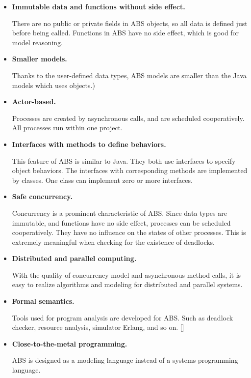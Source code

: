 \documentclass[article,dr=phil,type=drfinal,colorback,accentcolor=tud9c]{tudthesis}
\begin{document}
  \begin{itemize}
  	
  \item \textbf{Immutable data and functions without side effect.}
  
  There are no public or private fields in ABS objects, so all data is defined just before being called. Functions in ABS have no side effect, which is good for model reasoning.
  
  \item \textbf{Smaller models.}
   
  Thanks to the user-defined data types, ABS models are smaller than the Java models which uses objects.)
  
  \item \textbf{Actor-based.}
  
  Processes are created by asynchronous calls, and are scheduled cooperatively. All processes run within one project.
  
  \item \textbf{Interfaces with methods to define behaviors.}
  
  This feature of ABS is similar to Java. They both use interfaces to specify object behaviors. The interfaces with corresponding methods are implemented by classes. One class can implement zero or more interfaces.
  
  \item \textbf{Safe concurrency.}
  
  Concurrency is a prominent characteristic of ABS. Since data types are immutable, and functions have no side effect, processes can be scheduled cooperatively. They have no influence on the states of other processes. This is extremely meaningful when checking for the existence of deadlocks.
  
  \item \textbf{Distributed and parallel computing.}
  
  With the quality of concurrency model and asynchronous method calls, it is easy to realize algorithms and modeling for distributed and parallel systems.
  
  \item \textbf{Formal semantics.}
  
  Tools used for program analysis are developed for ABS. Such as deadlock checker, resource analysis, simulator Erlang, and so on. []
  
  \item \textbf{Close-to-the-metal programming.}
  
  ABS is designed as a modeling language instead of a systems programming language.
  
  \end{itemize}
\end{document}
